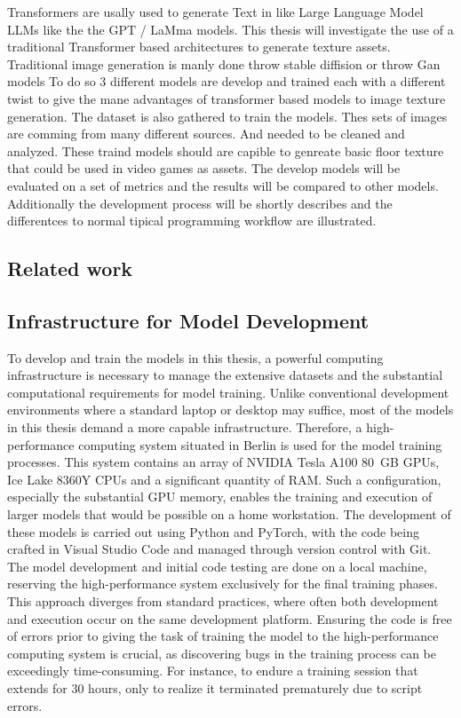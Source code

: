 
Transformers are usally used to generate Text in like Large Language Model LLMs like the the GPT / LaMma models. This thesis will investigate the use of a traditional Transformer based architectures to generate texture assets. Traditional image generation is manly done throw stable diffision or throw Gan models
To do so 3 different models are develop and trained each with a different twist to give the mane advantages of transformer based models to image texture generation. The dataset is also gathered to train the models. Thes sets of images are comming from many different sources. And needed to be cleaned and analyzed. These traind models should are capible to genreate basic floor texture that could be used in video games as assets. The develop models will be evaluated on a set of metrics and the results will be compared to other models. Additionally the development process will be shortly describes and the differentces to normal tipical programming workflow are illustrated. 

\subsection{Related work}
    

\subsection{Infrastructure for Model Development}

To develop and train the models in this thesis, a powerful computing infrastructure is necessary to manage the extensive datasets and the substantial computational requirements for model training. Unlike conventional development environments where a standard laptop or desktop may suffice, most of the models in this thesis demand a more capable infrastructure. Therefore, a high-performance computing system situated in Berlin is used for the model training processes. This system contains an array of NVIDIA Tesla A100 80 GB GPUs, Ice Lake 8360Y CPUs and a significant quantity of RAM. Such a configuration, especially the substantial GPU memory, enables the training and execution of larger models that would be possible on a home workstation. The development of these models is carried out using Python and PyTorch, with the code being crafted in Visual Studio Code and managed through version control with Git. The model development and initial code testing are done on a local machine, reserving the high-performance system exclusively for the final training phases. This approach diverges from standard practices, where often both development and execution occur on the same development platform. Ensuring the code is free of errors prior to giving the task of training the model to the high-performance computing system is crucial, as discovering bugs in the training process can be exceedingly time-consuming. For instance, to endure a training session that extends for 30 hours, only to realize it terminated prematurely due to script errors.

